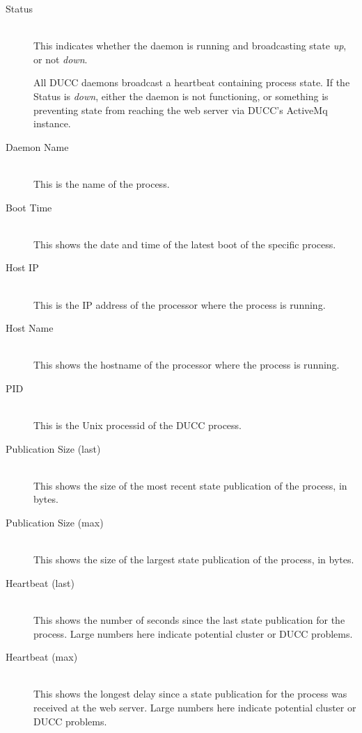    \begin{description}
      \item[Status] \hfill \\
        This indicates whether the daemon is running and broadcasting state {\em up},
        or not {\em down}.  
        
        All DUCC daemons broadcast a heartbeat containing process state.  If the Status
        is {\em down}, either the daemon is not functioning, or something is preventing
        state from reaching the web server via DUCC's ActiveMq instance.

      \item[Daemon Name] \hfill \\
        This is the name of the process.

      \item[Boot Time] \hfill \\ 
        This shows the date and time of the latest boot of the specific process.
          
      \item[Host IP] \hfill \\ 
        This is the IP address of the processor where the process is running.

      \item[Host Name] \hfill \\ 
        This shows the hostname of the processor where the process is running.

      \item[PID] \hfill \\ 
        This is the Unix processid of the DUCC process.


      \item[Publication Size (last)] \hfill \\ 
        This shows the size of the most recent state publication of the process, in bytes.

      \item[Publication Size (max)] \hfill \\ 
        This shows the size of the largest state publication of the process, in bytes.

      \item[Heartbeat (last)] \hfill \\ 
        This shows the number of seconds since the last state publication for the process. 
         Large numbers here indicate potential cluster or DUCC problems.

      \item[Heartbeat (max)] \hfill \\ 
        This shows the longest delay since a state publication for the process was received
        at the web server.  Large numbers here indicate potential cluster or DUCC problems.


\end{description}
